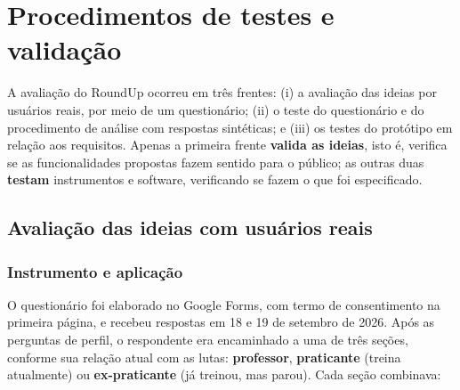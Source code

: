 %

\chapter{Procedimentos de testes e validação}
\label{cap:testes}

A avaliação do RoundUp ocorreu em três frentes: (i) a avaliação das
ideias por usuários reais, por meio de um questionário; (ii) o teste do
questionário e do procedimento de análise com respostas sintéticas; e
(iii) os testes do protótipo em relação aos requisitos. Apenas a primeira
frente \textbf{valida as ideias}, isto é, verifica se as funcionalidades
propostas fazem sentido para o público; as outras duas \textbf{testam}
instrumentos e software, verificando se fazem o que foi especificado.

\section{Avaliação das ideias com usuários reais}
\label{sec:val-survey}

\subsection{Instrumento e aplicação}

O questionário foi elaborado no Google Forms, com termo de consentimento
na primeira página, e recebeu respostas em 18 e 19 de setembro de 2026.
Após as perguntas de perfil, o respondente era encaminhado a uma de três
seções, conforme sua relação atual com as lutas: \textbf{professor},
\textbf{praticante} (treina atualmente) ou \textbf{ex-praticante} (já
treinou, mas parou). Cada seção combinava:


